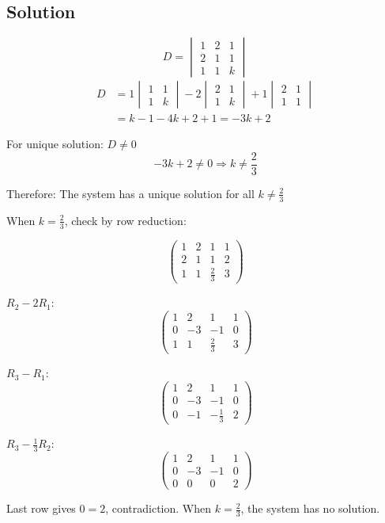 \subsection*{Solution}

\[
	D = \begin{vmatrix}
		1 & 2 & 1 \\
		2 & 1 & 1 \\
		1 & 1 & k
	\end{vmatrix}
\]
\begin{align*}
	D &= 1\begin{vmatrix}
		1 & 1 \\
		1 & k
	\end{vmatrix} - 2\begin{vmatrix}
		2 & 1 \\
		1 & k
	\end{vmatrix} + 1\begin{vmatrix}
		2 & 1 \\
		1 & 1
	\end{vmatrix} \\
	&= k - 1 - 4k + 2 + 1 = -3k + 2
\end{align*}

For unique solution: $D \neq 0$
\[
	-3k + 2 \neq 0 \Rightarrow k \neq \frac{2}{3}
\]

Therefore: The system has a unique solution for all $k \neq \frac{2}{3}$

When $k = \frac{2}{3}$, check by row reduction:

\[
	\left(\begin{array}{ccc|c}
		1 & 2 & 1 & 1 \\
		2 & 1 & 1 & 2 \\
		1 & 1 & \frac{2}{3} & 3
	\end{array}\right)
\]

$R_2 - 2R_1$:
\[
	\left(\begin{array}{ccc|c}
		1 & 2 & 1 & 1 \\
		0 & -3 & -1 & 0 \\
		1 & 1 & \frac{2}{3} & 3
	\end{array}\right)
\]

$R_3 - R_1$:
\[
	\left(\begin{array}{ccc|c}
		1 & 2 & 1 & 1 \\
		0 & -3 & -1 & 0 \\
		0 & -1 & -\frac{1}{3} & 2
	\end{array}\right)
\]

$R_3 - \frac{1}{3}R_2$:
\[
	\left(\begin{array}{ccc|c}
		1 & 2 & 1 & 1 \\
		0 & -3 & -1 & 0 \\
		0 & 0 & 0 & 2
	\end{array}\right)
\]

Last row gives $0 = 2$, contradiction. When $k = \frac{2}{3}$, the system has no solution.
